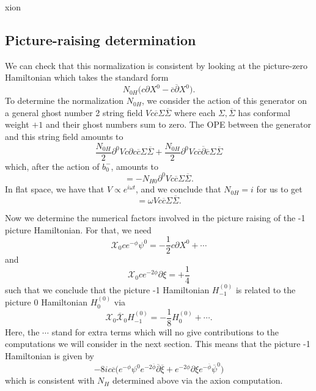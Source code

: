 xion\documentclass[12pt]{article}
\def\be{\begin{equation}}
\def\ee{\end{equation}}
\numberwithin{equation}{section}
\newcommand{\B}[1]{\overline{#1}}
\begin{document}
\subsection{Picture-raising determination}
We can check that this normalization is consistent by looking at the picture-zero Hamiltonian which takes the standard form
\be
	N_{0H}\big(c\partial X^{0}-\B{c}\B{\partial}X^{0}\big).
\ee
To determine the normalization $N_{0H}$, we consider the action of this generator on a general ghost number 2 string field $Vc\B{c}\Sigma\B{\Sigma}$ where each $\Sigma,\B{\Sigma}$ has conformal weight $+1$ and their ghost numbers sum to zero. The OPE between the generator and this string field amounts to
\be
	\frac{N_{0H}}{2}\partial^{0}Vc\partial c\B{c}\Sigma\B{\Sigma}+\frac{N_{0H}}{2}\partial^{0}Vc\B{c}\B{\partial}\B{c}\Sigma\B{\Sigma}
\ee
which, after the action of $b_{0}^{-}$, amounts to
\be
	[H^{(0)}_{0}\otimes Vc\B{c}\Sigma\B{\Sigma}]=-N_{H0}\partial^{0}Vc\B{c}\Sigma\B{\Sigma}.
\ee
In flat space, we have that $V\propto e^{i\omega t}$, and we conclude that $N_{0H}=i$ for us to get
\be
	[H^{(0)}_{0}\otimes Vc\B{c}\Sigma\B{\Sigma}]=\omega Vc\B{c}\Sigma\B{\Sigma}.
\ee

Now we determine the numerical factors involved in the picture raising of the -1 picture Hamiltonian. For that, we need
\be
	\mathcal{X}_{0}ce^{-\phi}\psi^{0}=-\frac{1}{2}c\partial X^{0}+\cdots
\ee
and
\be
	\mathcal{X}_{0}ce^{-2\phi}\partial\xi=+\frac{1}{4}
\ee
such that we conclude that the picture -1 Hamiltonian $H^{(0)}_{-1}$ is related to the picture 0 Hamiltonian $H^{(0)}_{0}$ via
\be
	\mathcal{X}_{0}\B{\mathcal{X}}_{0}H^{(0)}_{-1}=-\frac{1}{8}H^{(0)}_{0}+\cdots.
\ee
Here, the $\cdots$ stand for extra terms which will no give contributions to the computations we will consider in the next section. This means that the picture -1 Hamiltonian is given by
\be
	-8ic\B{c}\big(e^{-\phi}\psi^{0}e^{-2\B{\phi}}\B{\partial}\B{\xi}+e^{-2\phi}\partial\xi e^{-\B{\phi}}\B{\psi}^{0}\big)
\ee
which is consistent with $N_{H}$ determined above via the axion computation.
\end{document}
